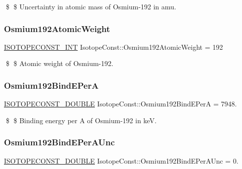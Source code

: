 \$ \$ Uncertainty in atomic mass of Osmium-\/192 in amu. \mbox{\label{group___isotope_const-_osmium-_os192_ga9b475f7a7f7901f783140eced1f13b09}} 
\subsubsection{\texorpdfstring{Osmium192\+Atomic\+Weight}{Osmium192AtomicWeight}}
{\footnotesize\ttfamily \mbox{\hyperlink{group___isotope_const-_macros_ga5f18360b3e99483a35c32d789e62621c}{I\+S\+O\+T\+O\+P\+E\+C\+O\+N\+S\+T\+\_\+\+I\+NT}} Isotope\+Const\+::\+Osmium192\+Atomic\+Weight = 192}

\$ \$ Atomic weight of Osmium-\/192. \mbox{\label{group___isotope_const-_osmium-_os192_gabcf5b7b6ede108032eb4b23f882b486a}} 
\subsubsection{\texorpdfstring{Osmium192\+Bind\+E\+PerA}{Osmium192BindEPerA}}
{\footnotesize\ttfamily \mbox{\hyperlink{group___isotope_const-_macros_ga8f45a7272ce02c0b4c65c44636ed719a}{I\+S\+O\+T\+O\+P\+E\+C\+O\+N\+S\+T\+\_\+\+D\+O\+U\+B\+LE}} Isotope\+Const\+::\+Osmium192\+Bind\+E\+PerA = 7948.}

\$ \$ Binding energy per A of Osmium-\/192 in keV. \mbox{\label{group___isotope_const-_osmium-_os192_gaf360d26f32cfa15b2df74c5d5f46a713}} 
\subsubsection{\texorpdfstring{Osmium192\+Bind\+E\+Per\+A\+Unc}{Osmium192BindEPerAUnc}}
{\footnotesize\ttfamily \mbox{\hyperlink{group___isotope_const-_macros_ga8f45a7272ce02c0b4c65c44636ed719a}{I\+S\+O\+T\+O\+P\+E\+C\+O\+N\+S\+T\+\_\+\+D\+O\+U\+B\+LE}} Isotope\+Const\+::\+Osmium192\+Bind\+E\+Per\+A\+Unc = 0.}

